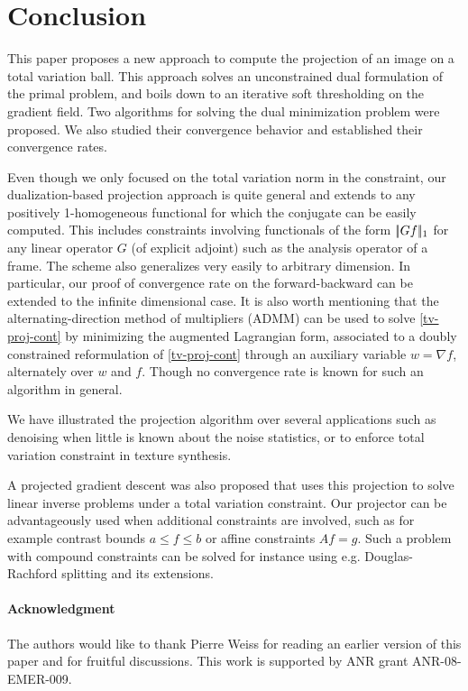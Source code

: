 \documentclass[11pt,nofonttune,a4paper]{IEEEtran}
\begin{document}
\section{Conclusion}

This paper proposes a new approach to compute the projection of an image on a total variation ball. This approach solves an unconstrained dual formulation of the primal problem, and boils down to an iterative soft thresholding on the gradient field. Two algorithms for solving the dual minimization problem were proposed. We also studied their convergence behavior and established their convergence rates.

Even though we only focused on the total variation norm in the constraint, our dualization-based projection approach is quite general and extends to any positively 1-homogeneous functional for which the conjugate can be easily computed. This includes constraints involving functionals of the form $|\!| G f |\!|_{1}$ for any linear operator $G$ (of explicit adjoint) such as the analysis operator of a frame. The scheme also generalizes very easily to arbitrary dimension.
In particular, our proof of convergence rate on the forward-backward can be extended to the infinite dimensional case. It is also worth mentioning that the alternating-direction method of multipliers (ADMM) \cite{Glowinski89} can be used to solve \eqref{tv-proj-cont} by minimizing the augmented Lagrangian form, associated to a doubly constrained reformulation of \eqref{tv-proj-cont} through an auxiliary variable $w=\nabla f$, alternately over $w$ and $f$. Though no convergence rate is known for such an algorithm in general.

We have illustrated the projection algorithm over several applications such as denoising when little is known about the noise statistics, or to enforce total variation constraint in texture synthesis.  

A projected gradient descent was also proposed that uses this projection to solve linear inverse problems under a total variation constraint. Our projector can be advantageously used when additional constraints are involved, such as for example contrast bounds $a \leq f \leq b$ or affine constraints $A f = g$. Such a problem with compound constraints can be solved for instance using e.g. Douglas-Rachford splitting and its extensions.


\paragraph*{Acknowledgment}
The authors would like to thank Pierre Weiss for reading an earlier version of this paper and for fruitful discussions. This work is supported by ANR grant ANR-08-EMER-009.

 



 
 
\end{document}
